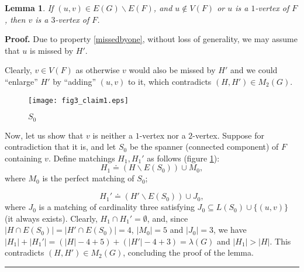 \documentclass[a4paper, 12pt]{article}
\newtheorem{lemma}{Lemma}[subsection]
\newenvironment{proof}[1][Proof]{\noindent\textbf{#1.} }{\ \rule{0.5em}{0.5em}}
\begin{document}
\begin{lemma} \label{mandatory3-vertex}
If $(u,v)\in E(G)\backslash E(F)$, and $u \notin V(F)$ or $u$ is a
$1$-vertex of $F$, then $v$ is a $3$-vertex of $F$.
\end{lemma}
\begin{proof}
Due to property \ref{missedbyone}, without loss of generality, we
may assume that $u$ is missed by $H'$.

Clearly, $v \in V(F)$ as otherwise $v$ would also be missed by $H'$
and we could ``enlarge'' $H'$ by ``adding'' $(u, v)$ to it, which
contradicts $(H, H') \in M_2(G)$.

\begin{figure}[h]
\begin{center}
\texttt{[image: fig3\_claim1.eps]}\\
\caption{$S_0$}\label{fig_claim_mandatory3vertex}
\end{center}
\end{figure}

Now, let us show that $v$ is neither a $1$-vertex nor a $2$-vertex.
Suppose for contradiction that it is, and let $S_0$ be the spanner
(connected component) of $F$ containing $v$. Define matchings $H_1,
H_1'$ as follows (figure \ref{fig_claim_mandatory3vertex}):
$$H_1 \doteq (H \backslash E(S_0)) \cup M_0,$$
where $M_0$ is the perfect matching of $S_0$;

$$H_1' \doteq (H' \backslash E(S_0)) \cup J_0,$$
where $J_0$ is a matching of cardinality three satisfying $J_0
\subseteq L(S_0) \cup \{(u,v)\}$ (it always exists). Clearly, $H_1
\cap H_1' = \emptyset$, and, since $|H \cap E(S_0)| = |H' \cap
E(S_0)| = 4$, $|M_0| = 5$ and $|J_0| = 3$, we have $|H_1| + |H_1'| =
(|H| - 4 + 5) + (|H'| - 4 + 3) = \lambda(G)$ and $|H_1|
> |H|$. This contradicts $(H,H') \in M_2(G)$, concluding the proof
of the lemma.
\end{proof}
\end{document}

